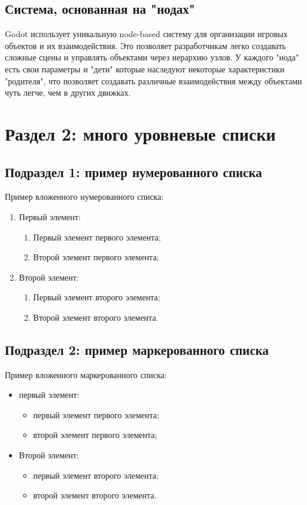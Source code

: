 \subsection{\label{subsec:ch01/sec01/sub02}Система, основанная на "нодах"}

Godot использует уникальную node-based систему для организации игровых объектов и их взаимодействия. Это позволяет разработчикам легко создавать сложные сцены и управлять объектами через иерархию узлов. У каждого "нода" есть свои параметры и "дети" которые наследуют некоторые характеристики "родителя", что позволяет создавать различные взаимодействия между объектами чуть легче, чем в других движках.

\section{\label{sec:ch01/sec02}Раздел 2: много уровневые списки}

\subsection{\label{subsec:ch01/sec02/sub01}Подраздел 1: пример нумерованного списка}

Пример вложенного нумерованного списка:
\begin{enumerate}
\item Первый элемент:
\begin{enumerate}
\item Первый элемент первого элемента;
\item Второй элемент первого элемента;
\end{enumerate}
\item Второй элемент:
\begin{enumerate}
\item Первый элемент второго элемента;
\item Второй элемент второго элемента.
\end{enumerate}
\end{enumerate}

\subsection{\label{subsec:ch01/sec02/sub02}Подраздел 2: пример маркерованного списка}

Пример вложенного маркерованного списка:
\begin{itemize}
\item первый элемент:
\begin{itemize}
\item первый элемент первого элемента;
\item второй элемент первого элемента;
\end{itemize}
\item Второй элемент:
\begin{itemize}
\item первый элемент второго элемента;
\item второй элемент второго элемента.
\end{itemize}
\end{itemize}

